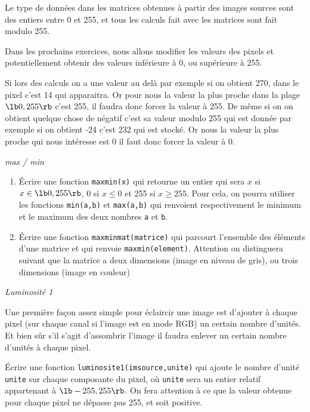 \documentclass[10pt,a4paper,pdftex]{book}
\begin{document}
Le type de données dans les matrices obtenues à partir des images sources sont des entiers entre 0 et 255, et tous les calculs fait avec les matrices sont fait modulo 255.

Dans les prochains exercices, nous allons modifier les valeurs des pixels et potentiellement obtenir des valeurs inférieure à 0, ou supérieure à 255.

Si lors des calculs on a une valeur au delà par exemple si on obtient 270, dans le pixel c'est 14 qui apparaitra. Or pour nous la valeur la plus proche dans la plage $\lb 0,255\rb$ c'est 255, il faudra donc forcer la valeur à 255.
De même si on on obtient quelque chose de négatif c'est sa valeur modulo 255 qui est donnée par exemple si on obtient -24 c'est 232 qui est stocké. Or nous la valeur la plus proche qui nous intéresse est 0 il faut donc forcer la valeur à 0.

\begin{exoc}{\textit{max / min}}
\begin{enumerate}
\item Écrire une fonction \texttt{maxmin(x)} qui retourne un entier qui sera $x$ si $x \in \lb 0,255\rb$, 0 si $x\leq 0$ et 255 si $x\geq 255$. Pour cela, on pourra utiliser les fonctions \texttt{min(a,b)} et \texttt{max(a,b)} qui renvoient respectivement le minimum et le maximum des deux nombres \texttt{a} et \texttt{b}.
\item Écrire une fonction \texttt{maxminmat(matrice)} qui parcourt l'ensemble des éléments d'une matrice et qui renvoie \texttt{maxmin(element)}. Attention on distinguera suivant que la matrice a deux dimensions (image en niveau de gris), ou trois dimensions (image en couleur)
\end{enumerate}
\end{exoc}


\begin{exoc}{\textit{Luminosité 1}}

Une première façon assez simple pour éclaircir une image est d'ajouter à chaque pixel (sur chaque canal si l'image est en mode RGB) un certain nombre d'unités. Et bien sûr s'il s'agit d'assombrir l'image il faudra enlever un certain nombre d'unités à chaque pixel.

\medskip
Écrire une fonction \verb!luminosite1(imsource,unite)! qui \og ajoute\fg{} le nombre d'unité \texttt{unite} sur chaque composante du pixel, où \texttt{unite} sera un entier relatif appartenant à $\lb -255,255\rb$. On fera attention à ce que la valeur obtenue pour chaque pixel ne dépasse pas 255, et soit positive.
\end{exoc}
\end{document}
